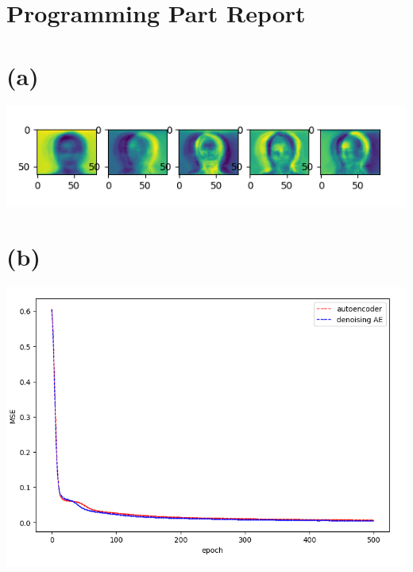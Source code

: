 \documentclass[12pt,a4paper]{article}
\begin{document}
\section*{Programming Part Report}
\section*{(a)}
\includegraphics{Figure1.png}
\newpage
\section*{(b)}
\includegraphics{Figure2.png}
\newpage
\end{document}
